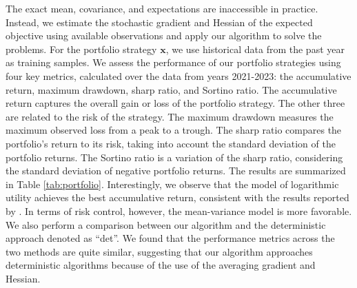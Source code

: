 \documentclass[aos]{imsart}
\numberwithin{equation}{section}
\theoremstyle{plain}
\begin{document}
\begin{table}[h]
  \centering
  \caption{Fama-French 100 Portfolios DataSet, 2021-2023}
\label{tab:portfolio}
\end{table}



The exact mean, covariance, and expectations are inaccessible in practice. Instead, we estimate the stochastic gradient and Hessian of the expected objective using available observations and apply our algorithm to solve the problems. For the portfolio strategy $\bm{x}$, we use historical data from the past year as training samples. 
We assess the performance of our portfolio strategies using four key metrics, calculated over the data from years 2021-2023: the accumulative return, maximum drawdown, sharp ratio, and Sortino ratio. The accumulative return captures the overall gain or loss of the portfolio strategy. The other three are related to the risk of the strategy. The maximum drawdown measures the maximum observed loss from a peak to a trough. The sharp ratio compares the portfolio's return to its risk, taking into account the standard deviation of the portfolio returns. The Sortino ratio is a variation of the sharp ratio, considering the standard deviation of negative portfolio returns. The results are summarized in Table \ref{tab:portfolio}. Interestingly, we observe that the model of logarithmic utility achieves the best accumulative return, consistent with the results reported by \cite{du2023high}. In terms of risk control, however, the mean-variance model is more favorable. We also perform a comparison between our algorithm and the deterministic approach denoted as ``det''. 
We found that the performance metrics across the two methods are quite similar, suggesting that our algorithm approaches deterministic algorithms because of the use of the averaging gradient and Hessian.
\end{document}
